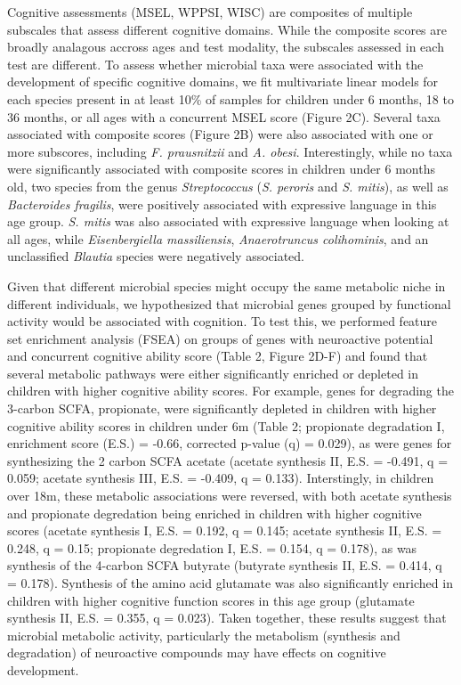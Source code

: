 \documentclass{article}
\begin{document}
Cognitive assessments (MSEL, WPPSI, WISC)
are composites of multiple subscales that assess different cognitive domains.
While the composite scores are broadly analagous accross ages and test modality,
the subscales assessed in each test are different.
To assess whether microbial taxa were associated with
the development of specific cognitive domains,
we fit multivariate linear models for each species present in at least 10\%
of samples for children under 6 months, 18 to 36 months, or all ages
with a concurrent MSEL score (Figure 2C).
Several taxa associated with composite scores (Figure 2B)
were also associated with one or more subscores, including
\textit{F. prausnitzii} and \textit{A. obesi}.
Interestingly, while no taxa were significantly associated
with composite scores in children under 6 months old,
two species from the genus \textit{Streptococcus}
(\textit{S. peroris} and \textit{S. mitis}), as well as
\textit{Bacteroides fragilis}, were positively associated
with expressive language in this age group.
\textit{S. mitis} was also associated with expressive language
when looking at all ages, while \textit{Eisenbergiella massiliensis},
\textit{Anaerotruncus colihominis}, and an unclassified \textit{Blautia}
species were negatively associated. %


Given that different microbial species might occupy the same metabolic
niche in different individuals, we hypothesized that microbial genes
grouped by functional activity would be associated with cognition. To
test this, we performed feature set enrichment analysis (FSEA) on groups
of genes with neuroactive potential
\cite{valles-colomerNeuroactivePotentialHuman2019}
and concurrent cognitive ability score (Table 2, Figure 2D-F) and found that
several metabolic pathways were either significantly enriched or depleted in
children with higher cognitive ability scores.
For example, genes for degrading the 3-carbon SCFA, propionate,
were significantly depleted in children with higher cognitive ability
scores in children under 6m (Table 2; propionate degradation I,
enrichment score (E.S.) = -0.66, corrected p-value (q)
= 0.029), as were genes for synthesizing the 2 carbon SCFA acetate
(acetate synthesis II, E.S. = -0.491, q = 0.059; acetate synthesis
III, E.S. = -0.409, q = 0.133).
Interstingly, in children over 18m,
these metabolic associations were reversed, with both acetate synthesis
and propionate degredation being enriched in children
with higher cognitive scores
(acetate synthesis I, E.S. = 0.192, q = 0.145;
acetate synthesis II, E.S. = 0.248, q = 0.15;
propionate degredation I, E.S. = 0.154, q = 0.178),
as was synthesis of the 4-carbon SCFA butyrate
(butyrate synthesis II, E.S. = 0.414, q = 0.178).
Synthesis of the amino acid
glutamate was also significantly enriched in children with
higher cognitive function scores in this age group (glutamate synthesis II, E.S. = 0.355, 
q = 0.023). Taken together, these results suggest that
microbial metabolic activity, particularly the metabolism (synthesis and
degradation) of neuroactive compounds may have effects on cognitive
development.
\end{document}

